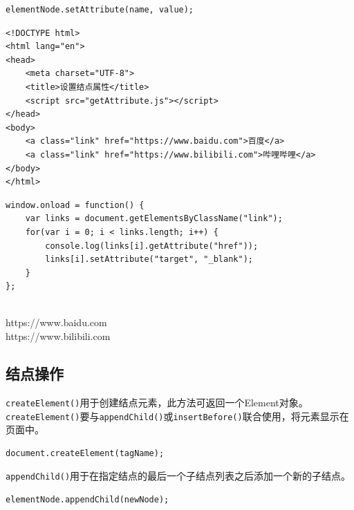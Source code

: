\begin{lstlisting}[style=htmlcssjs]
elementNode.setAttribute(name, value);
\end{lstlisting}


\begin{lstlisting}[style=htmlcssjs, title=getAttribute.html]
<!DOCTYPE html>
<html lang="en">
<head>
    <meta charset="UTF-8">
    <title>设置结点属性</title>
    <script src="getAttribute.js"></script>
</head>
<body>
    <a class="link" href="https://www.baidu.com">百度</a>
    <a class="link" href="https://www.bilibili.com">哔哩哔哩</a>
</body>
</html>
\end{lstlisting}

\begin{lstlisting}[style=htmlcssjs, title=getAttribute.js]
window.onload = function() {
    var links = document.getElementsByClassName("link");
    for(var i = 0; i < links.length; i++) {
        console.log(links[i].getAttribute("href"));
        links[i].setAttribute("target", "_blank");
    }
};
\end{lstlisting}

\begin{tcolorbox}
	 \\
	https://www.baidu.com \\
    https://www.bilibili.com
\end{tcolorbox}

\subsection{结点操作}

\lstinline|createElement()|用于创建结点元素，此方法可返回一个Element对象。 \\

\lstinline|createElement()|要与\lstinline|appendChild()|或\lstinline|insertBefore()|联合使用，将元素显示在页面中。 \\

\begin{lstlisting}[style=htmlcssjs]
document.createElement(tagName);
\end{lstlisting}

\lstinline|appendChild()|用于在指定结点的最后一个子结点列表之后添加一个新的子结点。 \\

\begin{lstlisting}[style=htmlcssjs]
elementNode.appendChild(newNode);
\end{lstlisting}

